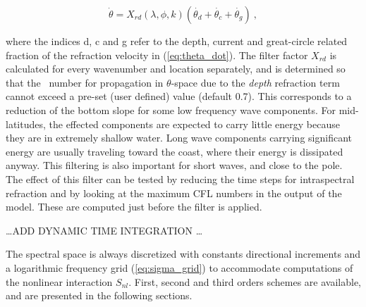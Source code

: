 
\begin{equation}
\dot{\theta} = X_{rd}(\lambda,\phi,k)\left( \dot{\theta_d} + 
\dot{\theta_c} + \dot{\theta_g} \right)\: , \label{eq:theta_filter} \end{equation}

\noindent
where the indices d, c and g refer to the depth, current and great-circle
related fraction of the refraction velocity in (\ref{eq:theta_dot}). The
filter factor $X_{rd}$ is calculated for every wavenumber and location
separately, and is determined so that the \cfl\ number for propagation in
$\theta$-space due to the {\em depth} refraction term cannot exceed a pre-set
(user defined) value (default 0.7). This corresponds to a reduction of the
bottom slope for some low frequency wave components. For mid-latitudes, the
effected components are expected to carry little energy because they are in
extremely shallow water. Long wave components carrying significant energy are
usually traveling toward the coast, where their energy is dissipated
anyway. This filtering is also important for short waves, and close to the
pole. The effect of this filter can be tested by reducing the time steps for
intraspectral refraction and by looking at the maximum CFL numbers in the
output of the model.  These are computed just before the filter is applied.

\vspace{\baselineskip}
\centerline{\ldots ADD DYNAMIC TIME INTEGRATION \ldots}


\vspace{\baselineskip} \noindent 
The spectral space is always discretized with constants directional increments
and a logarithmic frequency grid (\ref{eq:sigma_grid}) to accommodate
computations of the nonlinear interaction $S_{nl}$. First, second and third
orders schemes are available, and are presented in the following sections.